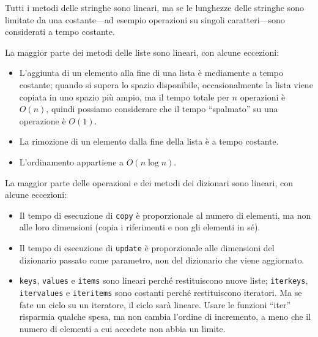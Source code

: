 \documentclass[10pt]{book}
\begin{document}

Tutti i metodi delle stringhe sono lineari, ma se le lunghezze delle stringhe sono limitate da una costante---ad esempio operazioni su singoli caratteri---sono considerati a tempo costante.

La maggior parte dei metodi delle liste sono lineari, con alcune eccezioni:

\begin{itemize}

\item L'aggiunta di un elemento alla fine di una lista è mediamente a tempo costante; quando si supera lo spazio disponibile, occasionalmente la lista viene copiata in uno spazio più ampio, ma il tempo totale per $n$ operazioni è $O(n)$, quindi possiamo considerare che il tempo ``spalmato'' su una operazione è $O(1)$.

\item La rimozione di un elemento dalla fine della lista è a tempo costante.

\item L'ordinamento appartiene a $O(n \log n)$.

\end{itemize}

La maggior parte delle operazioni e dei metodi dei dizionari sono lineari, con alcune eccezioni:

\begin{itemize}

\item Il tempo di esecuzione di {\tt copy} è proporzionale al numero di elementi, ma non alle loro dimensioni (copia i riferimenti e non gli elementi in sé).

\item Il tempo di esecuzione di {\tt update} è proporzionale alle dimensioni del dizionario passato come parametro, non del dizionario che viene aggiornato.

\item {\tt keys}, {\tt values} e {\tt items} sono lineari perché restituiscono nuove liste; {\tt iterkeys}, {\tt itervalues} e {\tt iteritems} sono costanti perché restituiscono iteratori. Ma se fate un ciclo su un iteratore, il ciclo sarà lineare. Usare le funzioni ``iter'' risparmia qualche spesa, ma non cambia l'ordine di incremento, a meno che il numero di elementi a cui accedete non abbia un limite.

\end{itemize}
\end{document}
